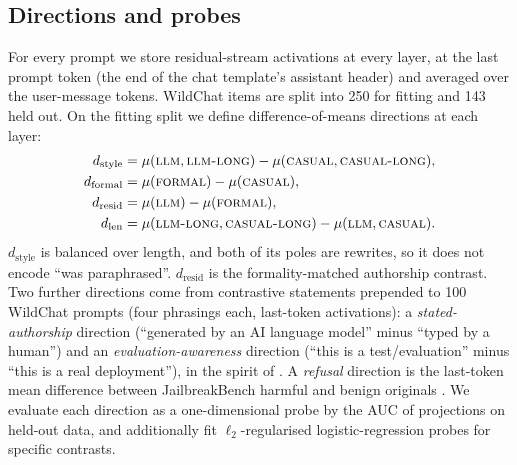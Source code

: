 \subsection{Directions and probes}
For every prompt we store residual-stream activations at every layer, at the last prompt token (the end of the chat template's assistant header) and averaged over the user-message tokens. WildChat items are split into 250 for fitting and 143 held out. On the fitting split we define difference-of-means directions at each layer:
\begin{align*}
d_{\text{style}} &= \mu(\textsc{llm},\textsc{llm-long}) - \mu(\textsc{casual},\textsc{casual-long}),\\
d_{\text{formal}} &= \mu(\textsc{formal}) - \mu(\textsc{casual}),\\
d_{\text{resid}} &= \mu(\textsc{llm}) - \mu(\textsc{formal}),\\
d_{\text{len}} &= \mu(\textsc{llm-long},\textsc{casual-long}) - \mu(\textsc{llm},\textsc{casual}).
\end{align*}
$d_{\text{style}}$ is balanced over length, and both of its poles are rewrites, so it does not encode ``was paraphrased''. $d_{\text{resid}}$ is the formality-matched authorship contrast. Two further directions come from contrastive statements prepended to 100 WildChat prompts (four phrasings each, last-token activations): a \emph{stated-authorship} direction (``generated by an AI language model'' minus ``typed by a human'') and an \emph{evaluation-awareness} direction (``this is a test/evaluation'' minus ``this is a real deployment''), in the spirit of \citet{nguyen2025probing}. A \emph{refusal} direction is the last-token mean difference between JailbreakBench harmful and benign originals \citep{arditi2024refusal}. We evaluate each direction as a one-dimensional probe by the AUC of projections on held-out data, and additionally fit $\ell_2$-regularised logistic-regression probes for specific contrasts.

